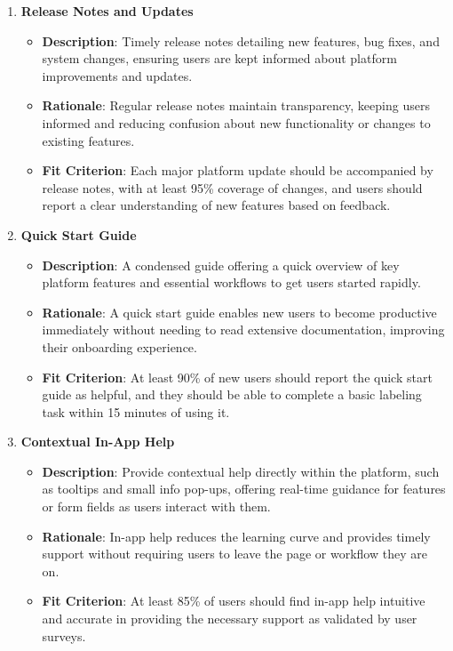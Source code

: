 \documentclass[12pt]{article}
\begin{document}
\begin{enumerate}
\begin{itemize}
        \end{itemize}
    \item \textbf{Release Notes and Updates}  
        \begin{itemize} 
            \item \textbf{Description}: Timely release notes detailing new features, bug fixes, and system changes, ensuring users are kept informed about platform improvements and updates.  
            \item \textbf{Rationale}: Regular release notes maintain transparency, keeping users informed and reducing confusion about new functionality or changes to existing features.  
            \item \textbf{Fit Criterion}: Each major platform update should be accompanied by release notes, with at least 95\% coverage of changes, and users should report a clear understanding of new features based on feedback.
        \end{itemize}
    \item \textbf{Quick Start Guide}  
        \begin{itemize} 
            \item \textbf{Description}: A condensed guide offering a quick overview of key platform features and essential workflows to get users started rapidly.  
            \item \textbf{Rationale}: A quick start guide enables new users to become productive immediately without needing to read extensive documentation, improving their onboarding experience.  
            \item \textbf{Fit Criterion}: At least 90\% of new users should report the quick start guide as helpful, and they should be able to complete a basic labeling task within 15 minutes of using it.
        \end{itemize}
    \item \textbf{Contextual In-App Help}  
        \begin{itemize} 
            \item \textbf{Description}: Provide contextual help directly within the platform, such as tooltips and small info pop-ups, offering real-time guidance for features or form fields as users interact with them.  
            \item \textbf{Rationale}: In-app help reduces the learning curve and provides timely support without requiring users to leave the page or workflow they are on.  
            \item \textbf{Fit Criterion}: At least 85\% of users should find in-app help intuitive and accurate in providing the necessary support as validated by user surveys.
        \end{itemize}
\end{enumerate}
\end{document}
